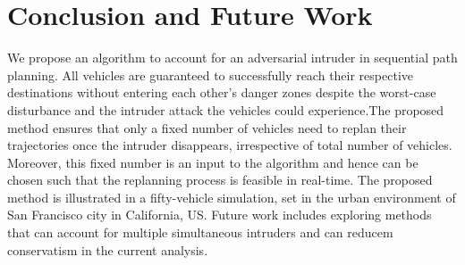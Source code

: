 \section{Conclusion and Future Work}
We propose an algorithm to account for an adversarial intruder in sequential path planning. All vehicles are guaranteed to successfully reach their respective destinations without entering each other's danger zones despite the worst-case disturbance and the intruder attack the vehicles could experience.The proposed method ensures that only a fixed number of vehicles need to replan their trajectories once the intruder disappears, irrespective of total number of vehicles. Moreover, this fixed number is an input to the algorithm and hence can be chosen such that the replanning process is feasible in real-time. The proposed method is illustrated in a fifty-vehicle simulation, set in the urban environment of San Francisco city in California, US. Future work includes exploring methods that can account for multiple simultaneous intruders and can reducem conservatism in the current analysis.